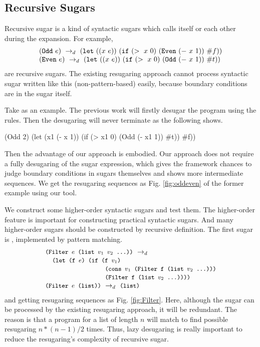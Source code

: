 \subsection{Recursive Sugars}
\label{sec:recursiveSugar}

Recursive sugar is a kind of syntactic sugars which calls itself or each other during the expansion. For example,
\[
\begin{array}{l}
(\mbox{\tt Odd}~e) ~\rightarrow_d~ (\mbox{\tt let}~((x~e))~(\mbox{\tt if}~(>~x~0)~(\mbox{\tt Even}~(-~x~1))~\#f))\\
(\mbox{\tt Even}~e) ~\rightarrow_d~ (\mbox{\tt let}~((x~e))~(\mbox{\tt if}~(>~x~0)~(\mbox{\tt Odd}~(-~x~1))~\#t))
\end{array}
\]
are recursive sugars. The existing resugaring approach cannot process syntactic sugar written like this (non-pattern-based) easily, because boundary conditions are in the sugar itself.

Take  as an example. The previous work will firstly desugar the program using the rules. Then the desugaring will never terminate as the following shows.
\begin{footnotesize}
\begin{Codes}
   (Odd 2)
\qquad\quad(let (x1 (- x 1)) (if (> x1 0) (Odd (- x1 1)) \#t))
\qquad\quad\#f))
\end{Codes}
\end{footnotesize}



Then the advantage of our approach is embodied. Our approach does not require a fully desugaring of the sugar expression, which gives the framework chances to judge boundary conditions in sugars themselves and shows more intermediate sequences. We get the resugaring sequences as Fig.  \ref{fig:oddeven} of the former example using our tool.



We construct some higher-order syntactic sugars and test them. The higher-order feature is important for constructing practical syntactic sugars. And many higher-order sugars should be constructed by recursive definition. The first sugar is , implemented by pattern matching.
\[\begin{array}{l}
\texttt{\small(Filter $e$ (list $v_1$ $v_2$ ...))} ~\rightarrow_d~\\
\quad
\texttt{\small (let (f $e$) (if (f $v_1$)}\\
\qquad\qquad\qquad\qquad\;\;\texttt{\small (cons $v_1$ (Filter f (list $v_2$ ...)))}\\
\qquad\qquad\qquad\qquad\;\;\texttt{\small (Filter f (list $v_2$ ...))))}\\

\texttt{\small(Filter $e$ (list))} ~\rightarrow_d~ \texttt{\small(list)}
\end{array}\]
and getting resugaring sequences as Fig.  \ref{fig:Filter}.
Here, although the sugar can be processed by the existing resugaring approach, it will be redundant. The reason is that a  program for a list of length $n$ will match to find possible resugaring $n*(n-1)/2$ times. Thus, lazy desugaring is really important to reduce the resugaring's complexity of recursive sugar.

